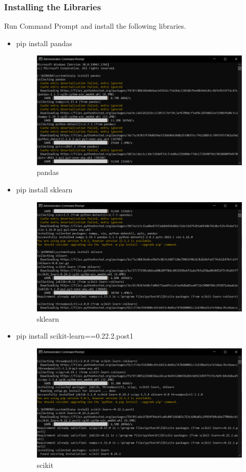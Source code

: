 \documentclass[10pt]{article}
\begin{document}
\subsubsection{Installing the Libraries}
Run Command Prompt and install the following libraries.
\begin{itemize}
    \item pip install pandas
\begin{figure}[H]
    \begin{center}
        \includegraphics[width=0.7\linewidth, frame]{CA2-template/CM19.png}
       \caption{pandas \label{fig:11}}
    \end{center}
\end{figure}

\item pip install sklearn
\begin{figure}[H]
    \begin{center}
        \includegraphics[width=0.7\linewidth, frame]{CA2-template/CM20.png}
       \caption{sklearn \label{fig:12}}
    \end{center}
\end{figure}

\item pip install scikit-learn==0.22.2.post1
\begin{figure}[H]
    \begin{center}
        \includegraphics[width=0.7\linewidth, frame]{CA2-template/CM21.png}
       \caption{scikit \label{fig:13}}
    \end{center}
\end{figure}


\end{itemize}
\end{document}
